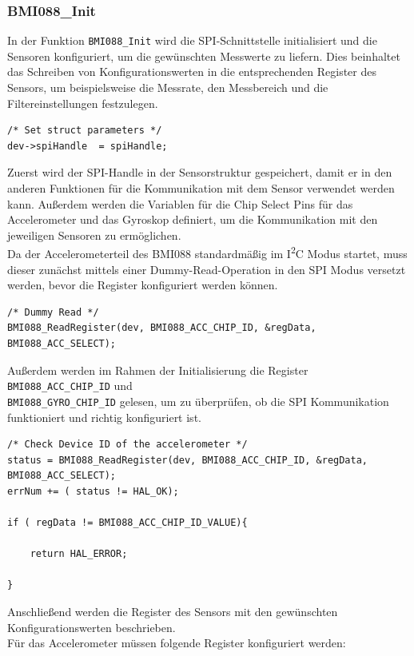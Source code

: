 \subsubsection{BMI088\_Init}
In der Funktion \texttt{BMI088\_Init} wird die SPI-Schnittstelle initialisiert und die Sensoren konfiguriert, um die gewünschten Messwerte zu liefern. Dies beinhaltet das Schreiben von Konfigurationswerten in die entsprechenden Register des Sensors, um beispielsweise die Messrate, den Messbereich und die Filtereinstellungen festzulegen.
\begin{lstlisting}[style=cstyle, caption={Struktur initialisieren}, label={lst:init_function}]
/* Set struct parameters */
dev->spiHandle	= spiHandle;
\end{lstlisting}
Zuerst wird der SPI-Handle in der Sensorstruktur gespeichert, damit er in den anderen Funktionen für die Kommunikation mit dem Sensor verwendet werden kann. Außerdem werden die Variablen für die Chip Select Pins für das Accelerometer und das Gyroskop definiert, um die Kommunikation mit den jeweiligen Sensoren zu ermöglichen.
\\
Da der Accelerometerteil des BMI088 standardmäßig im I\textsuperscript{2}C Modus startet, muss dieser zunächst mittels einer Dummy-Read-Operation in den SPI Modus versetzt werden, bevor die Register konfiguriert werden können. 
\begin{lstlisting}[style=cstyle, caption={SPI Modus aktivieren}, label={lst:enable_spi_mode}]
/* Dummy Read */
BMI088_ReadRegister(dev, BMI088_ACC_CHIP_ID, &regData, BMI088_ACC_SELECT);
\end{lstlisting}
Außerdem werden im Rahmen der Initialisierung die Register \texttt{BMI088\_ACC\_CHIP\_ID} und \\\texttt{BMI088\_GYRO\_CHIP\_ID} gelesen, um zu überprüfen, ob die SPI Kommunikation funktioniert und richtig konfiguriert ist.
\begin{lstlisting}[style=cstyle, caption={Chip ID überprüfen}, label={lst:check_chip_id}]
/* Check Device ID of the accelerometer */
status = BMI088_ReadRegister(dev, BMI088_ACC_CHIP_ID, &regData, BMI088_ACC_SELECT);
errNum += ( status != HAL_OK);

if ( regData != BMI088_ACC_CHIP_ID_VALUE){

    return HAL_ERROR;

}
\end{lstlisting}
Anschließend werden die Register des Sensors mit den gewünschten Konfigurationswerten beschrieben.
\\
Für das Accelerometer müssen folgende Register konfiguriert werden:
